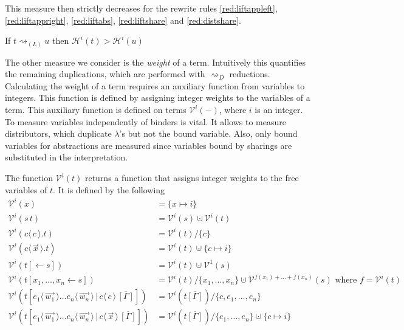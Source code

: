 \documentclass[a4paper,UKenglish,cleveref, autoref]{lipics-v2019}
\newcommand{\set}[1]{ \{ #1 \} }
\newcommand{\app}[2]{#1 \, #2}
\newcommand{\fake}[3]{#1 \langle \, #2 \, \rangle . #3}
\newcommand{\share}[3]{#1 [#2 \leftarrow #3]}
\newcommand{\dist}[5]{#1 [ #2 \, \vert \, \fakedist{#4}{#5} \, #3 ]}
\newcommand{\fakedist}[2]{#1 \langle \, #2 \, \rangle}
\newcommand{\height}[2]{\mathcal{H}^{#1}(#2)}
\newcommand{\weightvar}[2]{\mathcal{V}^{#1}(#2)}
\begin{document}
\noindent This measure then strictly decreases for the rewrite rules \ref{red:liftappleft}, \ref{red:liftappright}, \ref{red:liftabs}, \ref{red:liftshare} and \ref{red:distshare}.

\begin{lemma}
\label{theo:liftingheight}
If $t \rightsquigarrow_{(L)} u$ then $\height{i}{t} > \height{i}{u}$
\end{lemma}

The other measure we consider is the \emph{weight} of a term. Intuitively this quantifies the remaining duplications, which are performed with $\rightsquigarrow_{D}$ reductions. Calculating the weight of a term requires an auxiliary function from variables to integers. This function is defined by assigning integer weights to the variables of a term. This auxiliary function is defined on terms $\weightvar{i}{-}$, where $i$ is an integer. To measure variables independently of binders is vital. It allows to measure distributors, which duplicate $\lambda$'s but not the bound variable. Also, only bound variables for abstractions are measured since variables bound by sharings are substituted in the interpretation.

\begin{definition}
The function $\weightvar{i}{t}$ returns a function that assigns integer weights to the free variables of $t$. It is defined by the following
\begin{align*}
	\weightvar{i}{x} &= \set{x \mapsto i} \\
	\weightvar{i}{\app{s}{t}} &= \weightvar{i}{s} \cupdot \weightvar{i}{t} \\
	\weightvar{i}{\fake{c}{c}{t}} &= \weightvar{i}{t} / \set{c} \\
	\weightvar{i}{\fake{c}{\vec{x}}{t}} &= \weightvar{i}{t} \cupdot \set{c \mapsto i} \\
	\weightvar{i}{\share{t}{}{s}} &= \weightvar{i}{t} \cupdot \weightvar{1}{s} \\
	\weightvar{i}{\share{t}{x_{1}, \dots, x_{n}}{s}} &= \weightvar{i}{t} / \set{x_{1}, \dots, x_{n}} \cupdot \weightvar{f(x_{1}) + \dots + f(x_{n})}{s} \text{ where } f = \weightvar{i}{t} \\
	\weightvar{i}{\dist{t}{\fakedist{e_{1}}{\vec{w_{1}}} \dots \fakedist{e_{n}}{\vec{w_{n}}}}{\overline{[\Gamma]}}{c}{c}} &= \weightvar{i}{t\overline{[\Gamma]}} / \set{c, e_{1}, \dots, e_{n}} \\
	\weightvar{i}{\dist{t}{\fakedist{e_{1}}{\vec{w_{1}}} \dots \fakedist{e_{n}}{\vec{w_{n}}}}{\overline{[\Gamma]}}{c}{\vec{x}}} &= \weightvar{i}{t\overline{[\Gamma]}} / \set{e_{1}, \dots, e_{n}} \cupdot \set{c \mapsto i}
\end{align*}
\end{definition}
\end{document}
